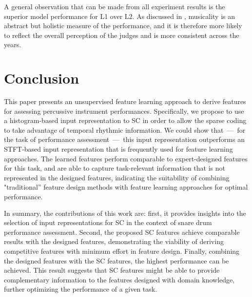 \documentclass[conference]{IEEEtran}
\begin{document}
A general observation that can be made from all experiment results is the superior model performance for L1 over L2. As discussed in \cite{Wu2016}, musicality is an abstract but holistic measure of the performance, and it is therefore more likely to reflect the overall perception of the judges and is more consistent across the years. %

\section{Conclusion}\label{sec:conclusion}
This paper presents an unsupervised feature learning approach to derive features for assessing percussive instrument performances. Specifically, we propose to use a histogram-based input representation to SC in order to allow the sparse coding to take advantage of temporal rhythmic information. We could show that~---~for the task of performance assessment~---~this input representation outperforms an STFT-based input representation that is frequently used for feature learning approaches. The learned features perform comparable to expert-designed features for this task, and are able to capture task-relevant information that is not represented in the designed features, indicating the suitability of combining "traditional'' feature design methods with feature learning approaches for optimal performance.

In summary, the contributions of this work are: 
first, it provides insights into the selection of input representations for SC in the context of snare drum performance assessment. 
Second, the proposed SC features achieve comparable results with the designed features, demonstrating the viability of deriving competitive features with minimum effort in feature design. 
Finally, combining the designed features with the SC features, the highest performance can be achieved. This result suggests that SC features might be able to provide complementary information to the features designed with domain knowledge, further optimizing the performance of a given task. 
\end{document}
